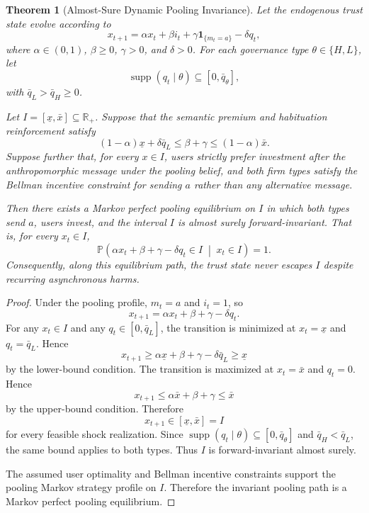 \documentclass[preprint,authoryear]{elsarticle}
\newtheorem{theorem}{Theorem}
\theoremstyle{definition}
\theoremstyle{plain}
\begin{document}
\begin{theorem}[Almost-Sure Dynamic Pooling Invariance]
\label{thm:dynamic-pooling-invariance}
Let the endogenous trust state evolve according to
\[
x_{t+1}
=
\alpha x_t+\beta i_t+\gamma\mathbf 1_{\{m_t=a\}}-\delta q_t,
\]
where $\alpha\in(0,1)$, $\beta\ge 0$, $\gamma>0$, and $\delta>0$.
For each governance type $\theta\in\{H,L\}$, let
\[
\operatorname{supp}(q_t\mid \theta)\subseteq [0,\bar q_\theta],
\]
with $\bar q_L>\bar q_H\ge 0$.

Let $I=[\underline x,\bar x]\subseteq \mathbb R_+$.
Suppose that the semantic premium and habituation reinforcement satisfy
\[
(1-\alpha)\underline{x}+\delta\bar q_L
\le
\beta+\gamma
\le
(1-\alpha)\bar{x}.
\]
Suppose further that, for every $x\in I$, users strictly prefer investment
after the anthropomorphic message under the pooling belief, and both firm
types satisfy the Bellman incentive constraint for sending $a$ rather than
any alternative message.

Then there exists a Markov perfect pooling equilibrium on $I$ in which both
types send $a$, users invest, and the interval $I$ is almost surely
forward-invariant. That is, for every $x_t\in I$,
\[
\mathbb P
\left(
\alpha x_t+\beta+\gamma-\delta q_t\in I
\;\middle|\;
x_t\in I
\right)
=
1.
\]
Consequently, along this equilibrium path, the trust state never escapes
$I$ despite recurring asynchronous harms.
\end{theorem}
\begin{proof}
Under the pooling profile, $m_t=a$ and $i_t=1$, so
\[
x_{t+1}
=
\alpha x_t+\beta+\gamma-\delta q_t.
\]
For any $x_t\in I$ and any $q_t\in[0,\bar q_L]$, the transition is minimized
at $x_t=\underline x$ and $q_t=\bar q_L$. Hence
\[
x_{t+1}
\ge
\alpha\underline x+\beta+\gamma-\delta\bar q_L
\ge
\underline x
\]
by the lower-bound condition. The transition is maximized at
$x_t=\bar x$ and $q_t=0$. Hence
\[
x_{t+1}
\le
\alpha\bar x+\beta+\gamma
\le
\bar x
\]
by the upper-bound condition. Therefore
\[
x_{t+1}\in[\underline x,\bar x]=I
\]
for every feasible shock realization. Since
$\operatorname{supp}(q_t\mid\theta)\subseteq[0,\bar q_\theta]$ and
$\bar q_H<\bar q_L$, the same bound applies to both types. Thus $I$ is
forward-invariant almost surely.

The assumed user optimality and Bellman incentive constraints support the
pooling Markov strategy profile on $I$. Therefore the invariant pooling path
is a Markov perfect pooling equilibrium.
\end{proof}
\end{document}
